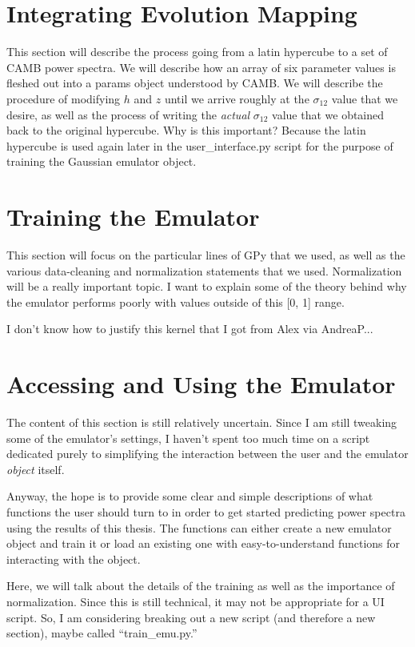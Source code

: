 \section{Integrating Evolution Mapping}
\label{sec: generate_emu_data}


This section will describe the process going from a latin hypercube to a set of CAMB power spectra. We will describe how an array of six parameter values is fleshed out into a params object understood by CAMB. We will describe the procedure of modifying $h$ and $z$ until we arrive roughly at the $\sigma_{12}$ value that we desire, as well as the process of writing the \textit{actual} $\sigma_{12}$ value that we obtained back to the original hypercube. Why is this important? Because the latin hypercube is used again later in the user\_interface.py script for the purpose of training the Gaussian emulator object.

\section{Training the Emulator}
\label{sec: emu_training}


This section will focus on the particular lines of GPy that we used, as well
as the various data-cleaning and normalization statements that we used.
Normalization will be a really important topic. I want to explain some of
the theory behind why the emulator performs poorly with values outside of this
[0, 1] range.

I don't know how to justify this kernel that I got from Alex via AndreaP...

\section{Accessing and Using the Emulator}


The content of this section is still relatively uncertain. Since I am still tweaking some of the emulator's settings, I haven't spent too much time on a script dedicated purely to simplifying the interaction between the user and the emulator \textit{object} itself.

Anyway, the hope is to provide some clear and simple descriptions of what functions the user should turn to in order to get started predicting power spectra using the results of this thesis. The functions can either create a new emulator object and train it or load an existing one with easy-to-understand functions for interacting with the object.

Here, we will talk about the details of the training as well as the importance of normalization. Since this is still technical, it may not be appropriate for a UI script. So, I am considering breaking out a new script (and therefore a new section), maybe called ``train\_emu.py.''

